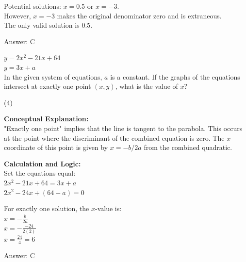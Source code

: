 \documentclass[11pt,paper=a4,answers]{exam}
\begin{document}
\begin{questions}
\begin{solution}
\vspace{10pt}

Potential solutions: $x = 0.5$ or $x = -3$. \\
However, $x = -3$ makes the original denominator zero and is extraneous. \\
The only valid solution is $0.5$.

\vspace{25pt}

Answer: \colorbox{yellow!100}{C}
\end{solution}

\vspace{40pt}

\question
$y = 2x^2 - 21x + 64$ \\
$y = 3x + a$ \\
In the given system of equations, $a$ is a constant. If the graphs of the equations intersect at exactly one point $(x, y)$, what is the value of $x$?
\begin{tasks}(4)
\end{tasks}

\begin{solution}
\textbf{Conceptual Explanation:} \\
"Exactly one point" implies that the line is tangent to the parabola. This occurs at the point where the discriminant of the combined equation is zero. The $x$-coordinate of this point is given by $x = -b/2a$ from the combined quadratic.

\vspace{20pt}

\textbf{Calculation and Logic:} \\
Set the equations equal: \\
$2x^2 - 21x + 64 = 3x + a$ \\
$2x^2 - 24x + (64 - a) = 0$

\vspace{10pt}

For exactly one solution, the $x$-value is: \\
$x = -\frac{b}{2a}$ \\
$x = -\frac{-24}{2(2)}$ \\
$x = \frac{24}{4} = 6$

\vspace{25pt}

Answer: \colorbox{yellow!100}{C}
\end{solution}


\end{questions}
\end{document}
